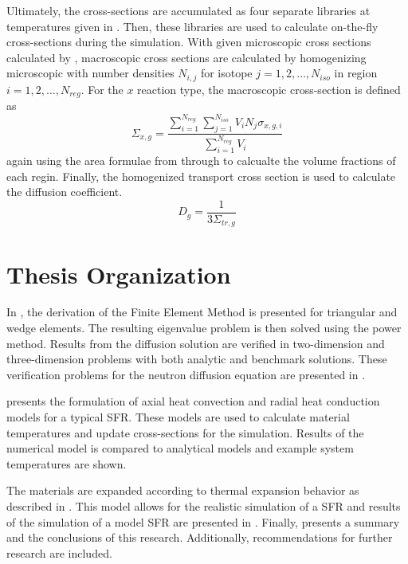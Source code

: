   Ultimately, the cross-sections are accumulated as four separate libraries at
  temperatures given in . Then, these libraries are used to
  calculate on-the-fly cross-sections during the simulation.
  With given microscopic cross sections calculated by \mcc, macroscopic cross
  sections are calculated by homogenizing microscopic with number densities
  $N_{i,j}$ for isotope ${j=1,2,\ldots,N_{iso}}$ in region
  ${i=1,2,\ldots,N_{reg}}$.  For the $x$ reaction type, the 
  macroscopic cross-section is defined as
  \begin{equation}
    \Sigma_{x,g} = \frac{\sum_{i=1}^{N_{reg}} \sum_{j=1}^{N_{iso}} V_i N_{j} 
      \sigma_{x,g,i}} {\sum_{i=1}^{N_{reg}}V_i}
  \end{equation}
  again using the area formulae from  through
   to calcualte the volume fractions of each regin.
  Finally, the homogenized transport cross section is used to calculate the 
  diffusion coefficient.
  \begin{equation}
    D_g = \frac{1}{3 \Sigma_{tr,g}}
  \end{equation}

\section{Thesis Organization}
  In , the derivation of the Finite Element Method is
  presented for triangular and wedge elements. The resulting eigenvalue problem
  is then solved using the power method. Results from the diffusion solution are
  verified in two-dimension and three-dimension problems with both analytic and
  benchmark solutions. These verification problems for the neutron diffusion
  equation are presented in .

   presents the formulation of axial heat convection
  and radial heat conduction models for a typical SFR. These models are used to
  calculate material temperatures and update cross-sections for the simulation.
  Results of the numerical model is compared to analytical models and example
  system temperatures are shown.

  The materials are expanded according to thermal expansion behavior as
  described in . This model allows for the realistic
  simulation of a SFR and results of the simulation of a model SFR are presented
  in . Finally,  presents a 
  summary and the conclusions of this research. Additionally, recommendations 
  for further research are included.

